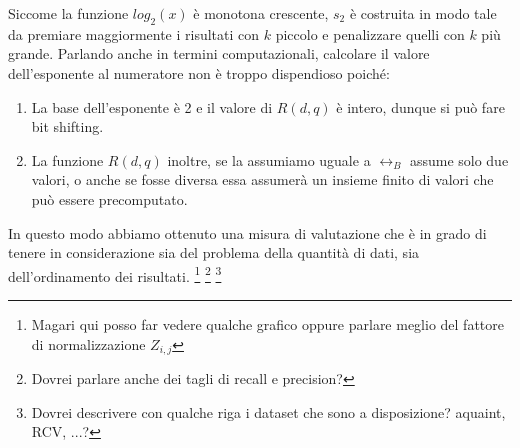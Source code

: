 Siccome la funzione $log_2(x)$ è monotona crescente, $s_2$ è costruita in modo tale da
premiare maggiormente i risultati con $k$ piccolo e penalizzare quelli con $k$ più grande.
Parlando anche in termini computazionali, calcolare il valore dell'esponente al numeratore
non è troppo dispendioso poiché:
\begin{enumerate}
	\item La base dell'esponente è 2 e il valore di $R(d,q)$ è intero, dunque si può fare bit shifting.
	\item La funzione $R(d,q)$ inoltre, se la assumiamo uguale a $\rel_B$ assume solo due valori,
	o anche se fosse diversa essa assumerà un insieme finito di valori che può essere precomputato.
\end{enumerate}

In questo modo abbiamo ottenuto una misura di valutazione che è in grado di tenere in considerazione
sia del problema della quantità di dati, sia dell'ordinamento dei risultati.
\footnote{Magari qui posso far vedere qualche grafico oppure parlare meglio del fattore di normalizzazione $Z_{i,j}$}
\footnote{Dovrei parlare anche dei tagli di recall e precision?}
\footnote{Dovrei descrivere con qualche riga i dataset che sono a disposizione? aquaint, RCV, ...?}